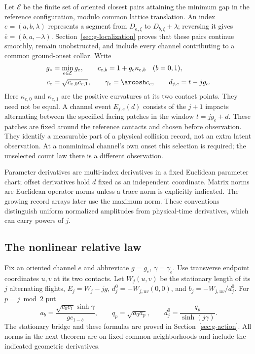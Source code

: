 Let $\mathcal E$ be the finite set of oriented closest pairs attaining
the minimum gap in the reference configuration, modulo common lattice
translation. An index $e=(a,b,\lambda)$ represents a segment from
$D_{a,\xi}$ to $D_{b,\xi}+\lambda$; reversing it gives
$\bar e=(b,a,-\lambda)$. Section~\ref{sec:g-localization} proves that
these pairs continue smoothly, remain unobstructed, and include every
channel contributing to a common ground-onset collar. Write
\begin{equation}\label{eq:g-general-data}
 \begin{split}
 g_*&=\min_{e\in\mathcal E}g_e,\qquad
 c_{e,b}=1+g_e\kappa_{e,b}\quad(b=0,1),\\
 c_e&=\sqrt{c_{e,0}c_{e,1}},\qquad \gamma_e=\arcosh c_e,
 \qquad d_{j,e}=t-jg_e.
 \end{split}
\end{equation}
Here $\kappa_{e,0}$ and $\kappa_{e,1}$ are the positive curvatures at
its two contact points. They need not be equal. A channel event
$E_{j,e}(d)$ consists of the $j+1$ impacts alternating between the
specified facing patches in the window $t=jg_e+d$. These patches are
fixed around the reference contacts and chosen before observation.
They identify a measurable part of a physical collision record, not an
extra latent observation. At a nonminimal channel's own onset this
selection is required; the unselected count law there is a different
observation.

Parameter derivatives are multi-index derivatives in a fixed Euclidean
parameter chart; offset derivatives hold $d$ fixed as an independent
coordinate. Matrix norms are Euclidean operator norms unless a trace
norm is explicitly indicated. The growing record arrays later use the
maximum norm. These conventions distinguish uniform normalized
amplitudes from physical-time derivatives, which can carry powers of $j$.


\subsection{The nonlinear relative law}
Fix an oriented channel $e$ and abbreviate $g=g_e$, $\gamma=\gamma_e$.
Use transverse endpoint coordinates $u,v$ at its two contacts. Let
$W_j(u,v)$ be the stationary length of its $j$ alternating flights,
$E_j=W_j-jg$, $d_j^0=-W_{j,uv}(0,0)$, and $b_j=-W_{j,uv}/d_j^0$.
For $p=j\bmod2$ put
\[
 a_b=\frac{\sqrt{c_0c_1}\sinh\gamma}{g c_{1-b}},\qquad
 q_p=\sqrt{a_0a_p},\qquad d_j^0=\frac{q_p}{\sinh(j\gamma)}.
\]
The stationary bridge and these formulas are proved in
Section~\ref{sec:g-action}. All norms in the next theorem are on fixed
common neighborhoods and include the indicated geometric derivatives.


